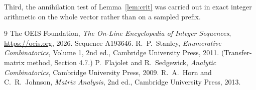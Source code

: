 \documentclass[11pt,a4paper]{article}
\theoremstyle{plain}
\theoremstyle{definition}
\begin{document}
Third, the annihilation test of Lemma~\ref{lem:crit} was carried out in exact integer
arithmetic on the whole vector rather than on a sampled prefix.

\begin{thebibliography}{9}
 The OEIS Foundation, \emph{The On-Line Encyclopedia of Integer
Sequences}, \url{https://oeis.org}, 2026. Sequence A193646.
 R.~P.~Stanley, \emph{Enumerative Combinatorics}, Volume 1, 2nd ed.,
Cambridge University Press, 2011. (Transfer-matrix method, Section 4.7.)
 P.~Flajolet and R.~Sedgewick, \emph{Analytic Combinatorics}, Cambridge
University Press, 2009.
 R.~A.~Horn and C.~R.~Johnson, \emph{Matrix Analysis}, 2nd ed., Cambridge
University Press, 2013.
\end{thebibliography}
\end{document}
